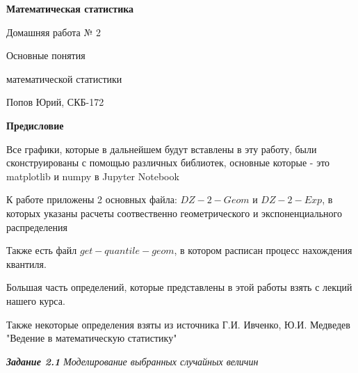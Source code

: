 \documentclass[a4paper,12pt, oneside]{book}
\begin{document}
	\pagestyle{plain}
	
	\begin{titlepage}	
		\begin{center}
			{\Huge \textbf{Математическая статистика}}
			\vspace{30mm}
			
			{\Huge Домашняя работа № 2 \\}
			\vspace{30mm}
			
			{\huge Основные понятия 
				
				математической статистики}
			\vspace{30mm}
			
			{\Large Попов Юрий, СКБ-172}
		\end{center}
	\end{titlepage}
	
	
	
	\begin{spacing}{0.99}          
		\tableofcontents %
	\end{spacing}

\newpage
\begin{center}
	{\Huge{\bf{Предисловие}}}
\end{center}

\vspace{5mm}
Все графики, которые в дальнейшем будут вставлены в эту работу, были сконструированы с помощью различных библиотек, основные которые - это matplotlib  и numpy в Jupyter Notebook

К работе приложены 2 основных файла: $DZ-2-Geom$ и $DZ-2-Exp$, в которых указаны расчеты  соотвественно геометрического и  экспоненциального распределения

Также есть файл $get-quantile-geom$, в котором расписан процесс нахождения квантиля.
\vspace{5mm}

Большая часть определений, которые представлены в этой работы взять с лекций нашего курса. 
\vspace{5mm}

Также некоторые определения взяты из источника   Г.И. Ивченко, Ю.И. Медведев \\
"Ведение в математическую статистику"

 
\newpage
{\large\textit{\textbf{Задание 2.1} Моделирование выбранных случайных величин}}
\end{document}
